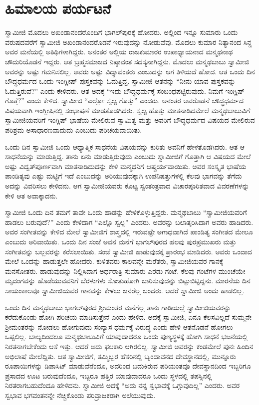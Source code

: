 
\chapter{ಹಿಮಾಲಯ ಪರ್ಯಟನೆ}

ಸ್ವಾಮೀಜಿ ಮೊದಲು ಅಖಂಡಾನಂದರೊಂದಿಗೆ ಭಾಗಲ್‍ಪುರಕ್ಕೆ ಹೋದರು. ಅಲ್ಲಿಂದ ಇನ್ನೂ ಸುಮಾರು ಒಂದು ವರುಷದವರೆಗೆ ಸ್ವಾಮೀಜಿ ಅಖಂಡಾನಂದರೊಡನೆ ಇರುವುದನ್ನು ನೋಡುವೆವು. ಮೊದಲು ಕುಮಾರ ನಿತ್ಯಾನಂದ ಸಿನ್ಹ ಅವರ ಮನೆಯಲ್ಲಿ ಅತಿಥಿಗಳಾಗಿದ್ದರು. ಅನಂತರ ಅಲ್ಲಿಯ ರಾಜಕುಮಾರರ ಉಪಾಧ್ಯಾಯನಾದ ಮನ್ಮಥನಾಥ ಚೌದುರಿಯೊಡನೆ ಇದ್ದರು. ಆತ ಬ್ರಹ್ಮಸಮಾಜದ ನಿಷ್ಠಾವಂತ ಸದಸ್ಯನಾಗಿದ್ದನು. ಮೊದಲು ಮನ್ಮಥಬಾಬು ಸ್ವಾಮೀಜಿ ಅವರನ್ನು ಅಷ್ಟು ಗಮನಿಸಲಿಲ್ಲ. ಅವರು ಅಷ್ಟು ವಿದ್ಯಾವಂತರು ಎಂಬುದನ್ನು ಆಗ ತಿಳಿಯದೆ ಹೋದ. ಆತ ಒಂದು ದಿನ ಬೌದ್ಧಧರ್ಮದ ಒಂದು ಇಂಗ್ಲೀಷ್ ಪುಸ್ತಕವನ್ನು ಓದುತ್ತಿದ್ದ. ಸ್ವಾಮೀಜಿ ಆತನನ್ನು “ನೀನು ಯಾವ ಪುಸ್ತಕವನ್ನು ಓದುತ್ತಿರುವೆ?” ಎಂದು ಕೇಳಿದರು. ಆತ ಅದಕ್ಕೆ “ಇದು ಬೌದ್ಧಧರ್ಮಕ್ಕೆ ಸಂಬಂಧಪಟ್ಟಿರುವುದು. ನಿಮಗೆ ಇಂಗ್ಲಿಷ್ ಗೊತ್ತೆ?” ಎಂದು ಕೇಳಿದ. ಸ್ವಾಮೀಜಿ “ಎಲ್ಲೋ ಸ್ವಲ್ಪ ಗೊತ್ತು” ಎಂದರು. ಅನಂತರ ಅವರೊಡನೆ ಬೌದ್ಧಧರ್ಮದ ವಿಷಯವಾಗಿ ಇಂಗ್ಲೀಷಿನಲ್ಲಿ ಸಂಭಾಷಣೆ ಮಾಡತೊಡಗಿದರು. ಸ್ವಲ್ಪ ಹೊತ್ತು ಮಾತನಾಡಿದಮೇಲೆ ಮನ್ಮಥಬಾಬುವಿಗೆ ಸ್ವಾಮೀಜಿಯವರಿಗೆ ಇಂಗ್ಲಿಷ್ ಭಾಷೆಯ ಮೇಲಿರುವ ಸ್ವಾಮಿತ್ವ ಮತ್ತು ಅವರಿಗೆ ಬೌದ್ಧಧರ್ಮದ ವಿಷಯದ ಮೇಲಿರುವ ಪರಿಶ್ರಮ ಅಸಾಧಾರಣವಾದುದು ಎಂಬುದು ಪರಿಚಯವಾಯಿತು. 

ಒಂದು ದಿನ ಸ್ವಾಮೀಜಿ ಒಂದು ಆಧ್ಯಾತ್ಮಿಕ ಸಾಧನೆಯ ವಿಷಯವನ್ನು ಕುರಿತು ಅವನಿಗೆ ಹೇಳತೊಡಗಿದರು. ಆತ ಆ ಸಾಧನೆಯನ್ನು ಮಾಡುತ್ತಿದ್ದ. ತಾನು ಏನು ಮಾಡುತ್ತಿರುವುದು ಎಂಬುದು ಸ್ವಾಮೀಜಿಗೆ ಗೊತ್ತಾಗಿ ಆ ವಿಷಯದ ಮೇಲೆ ಅಷ್ಟು ವಿದ್ವತ್‍ಪೂರ್ಣವಾಗಿ ಮಾತನಾಡಿದುದನ್ನು ಕೇಳಿ ಮನ್ಮಥನಿಗೆ ಆಷ್ಚರ್ಯವಾಯಿತು. ಅವರ ಸಂಸ್ಕೃತ ಭಾಷೆಯ ಪಾಂಡಿತ್ಯವು ಎಷ್ಟು ಮಟ್ಟಿಗೆ ಇದೆ ಎಂಬುದನ್ನು ಅರಿಯುವುದಕ್ಕಾಗಿ ಉಪನಿಷತ್ತುಗಳಲ್ಲಿ ಕೆಲವು ಭಾಗವನ್ನು ತೆಗೆದು ಅದನ್ನು ವಿವರಿಸಲು ಕೇಳಿದನು. ಆಗ ಸ್ವಾಮೀಜಿಯವರು ಕೊಟ್ಟ ಸ್ವಂತಂತ್ರವಾದ ವಿಚಾರಪೂರಿತವಾದ ವಿವರಣೆಗಳನ್ನು ಕೇಳಿ ಆತ ಅವಾಕ್ಕಾದನು. 

ಸ್ವಾಮೀಜಿ ಒಂದು ದಿನ ತಮಗೆ ತಾವೇ ಒಂದು ಹಾಡನ್ನು ಹೇಳಿಕೊಳ್ಳುತ್ತಿದ್ದರು. ಮನ್ಮಥಬಾಬು “ಸ್ವಾಮೀಜಿಯವರಿಗೆ ಹಾಡಲು ಬರುವುದೆ?” ಎಂದು ಕೇಳಿದಾಗ “ಎಲ್ಲೊ ಸ್ವಲ್ಪ” ಎಂದರು. ಅವರನ್ನು ಬಲಾತ್ಕರಿಸಿದಾಗ ಅವರು ಹಾಡಿದರು. ಅವರ ಸಂಗೀತವನ್ನು ಕೇಳಿದ ಮೇಲೆ ಸ್ವಾಮೀಜಿಗೆ ಶಾಸ್ತ್ರದಲ್ಲಿ ಇರುವಷ್ಟೇ ಅಗಾಧವಾಗಿದೆ ಪಾಂಡಿತ್ಯ ಸಂಗೀತದ ಮೇಲೂ ಎಂಬುದು ಅರಿವಾಯಿತು. ಒಂದು ದಿನ ಸಂಜೆ ಅವನ ಮನೆಗೆ ಭಾಗಲ್‍ಪುರದ ಹಲವು ಪುರಪ್ರಮುಖರು ಮತ್ತು ಸಂಗೀತವನ್ನು ಬಲ್ಲವರನ್ನು ಕರೆಸಲಾಯಿತು. ಸಂಜೆ ಸ್ವಾಮೀಜಿ ಹಾಡುವುದಕ್ಕೆ ಪ್ರಾರಂಭ ಮಾಡಿದರು. ಅವರು ಒಂದಾದ ಮೇಲೆ ಒಂದನ್ನು ಹಾಡುತ್ತಲೇ ಹೋದರು. ಕುಳಿತವರು ಕಾಲವನ್ನೇ ಮರೆತರು, ಸ್ವಾಮೀಜಿಯವರ ಗಾನಕ್ಕೆ ಮನಸೋತರು. ಹಾಡುವುದನ್ನು ನಿಲ್ಲಿಸಿದಾಗ ಅರ್ಧರಾತ್ರಿ ಸುಮಾರು ಎರಡು ಗಂಟೆ. ಕೆಲವು ಗಂಟೆಗಳ ಮುಂಚೆಯೇ ಮೃದಂಗವನ್ನು ಹೊಡೆಯುವವನಿಗೆ ಬೆರಳುಗಳು ಸೋತುಹೋಗಿ ಬಾರಿಸುವುದನ್ನು ಬಿಟ್ಟುಬಿಟ್ಟಿದ್ದನು. ಮಾರನೆಯ ದಿನ ಸಾಯಂಕಾಲವೂ ಸ್ವಾಮೀಜಿಯವರ ಗಾನವನ್ನು ಕೇಳಲು ಜನರೆಲ್ಲ ಬಂದರು. ಆದರೆ ಸ್ವಾಮೀಜಿ ಅಂದು ಹಾಡಲಿಲ್ಲ. 

ಒಂದು ದಿನ ಮನ್ಮಥಬಾಬು ಭಾಗಲ್‍ಪುರದ ಶ‍್ರೀಮಂತರ ಮನೆಗೆಲ್ಲ ತಾನು ಗಾಡಿಯಲ್ಲೆ ಸ್ವಾಮೀಜಿಯವರನ್ನು ಕರೆದುಕೊಂಡು ಹೋಗಿ ಪರಿಚಯ ಮಾಡಿಸುತ್ತೇನೆ ಎಂದು ಹೇಳಿದ. ಅದಕ್ಕೆ ಸ್ವಾಮೀಜಿ, ಏನೂ ಕೆಲಸವಿಲ್ಲದೆ ಸುಮ್ಮನೇ ಶ‍್ರೀಮಂತರನ್ನು ನೋಡಲು ಹೋಗುವುದು ಸಂನ್ಯಾಸ ಧರ್ಮಕ್ಕೆ ವಿರುದ್ಧ ಎಂದು ಹೇಳಿ ಆತನೊಡನೆ ಹೋಗಲು ಒಪ್ಪಲಿಲ್ಲ. ಬಾಲ್ಯದಿಂದಲೂ ಮನ್ಮಥಬಾಬುವಿಗೆ ಯಾವುದಾದರೂ ಒಂದು ಪುಣ್ಯಸ್ಥಳಕ್ಕೆ ಹೋಗಿ ಸಾಧನೆ ಭಜನೆಯಲ್ಲಿ ನಿರತನಾಗಬೇಕೆಂದು ಆಸೆ ಇತ್ತು. ಆದರೆ ಅದು ಫಲಕಾರಿ ಆಗಿರಲಿಲ್ಲ. ಸ್ವಾಮೀಜಿ ಅವರನ್ನು ಕಂಡಮೇಲೆ ಪುನಃ ಹಿಂದಿನ ಅಭಿಲಾಷೆ ಮೇಲೆದ್ದಿತು. ಆತ ಸ್ವಾಮೀಜಿಗೆ, ತಮ್ಮಿಬ್ಬರ ಹೆಸರಿನಲ್ಲಿ ಬೃಂದಾವನದ ದೇವಸ್ಥಾನದಲ್ಲಿ, ಮುನ್ನೂರು ರೂಪಾಯಿಗಳನ್ನು ಡಿಪಾಸಿಟ್ ಮಾಡುವೆನೆಂದೂ, ಅದರಿಂದ ಬದುಕಿರುವ ಪರಿಯಂತವೂ ದೇವಸ್ಥಾನದಿಂದ ಇಬ್ಬರಿಗೂ ಪ್ರಸಾದದ ಊಟ ಬರುವುದೆಂದೂ, ಇಬ್ಬರೂ ಹತ್ತಿರ ಯಾವುದಾದರೂ ಒಂದು ಸ್ಥಳದಲ್ಲಿ ತಪಸ್ಸಿನಲ್ಲಿ ನಿರತರಾಗಬಹುದೆಂದೂ ಹೇಳಿದನು. ಸ್ವಾಮೀಜಿ ಅದಕ್ಕೆ “ಅದು ನನ್ನ ಸ್ವಭಾವಕ್ಕೆ ಒಗ್ಗುವುದಿಲ್ಲ” ಎಂದರು. ಅವರ ಸ್ವಭಾವ ಭಗವಂತನನ್ನೇ ನೆಚ್ಚಿಕೊಂಡು ಪರಿವ್ರಾಜಕರಾಗಿ ಅಲೆಯುವುದು. 

